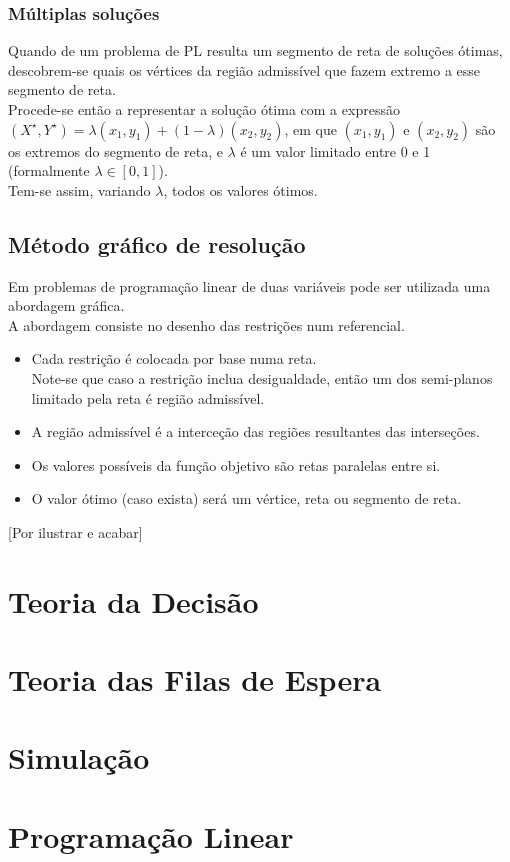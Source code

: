 \documentclass[]{report}
\begin{document}
\subsection{Múltiplas soluções}
Quando de um problema de PL resulta um segmento de reta de soluções ótimas, descobrem-se quais os vértices da região admissível que fazem extremo a esse segmento de reta.\\
Procede-se então a representar a solução ótima com a expressão $(X^\star, Y^\star) = \lambda (x_1, y_1)+(1-\lambda)(x_2, y_2)$, em que $(x_1, y_1)$ e $(x_2, y_2)$ são os extremos do segmento de reta, e $\lambda$ é um valor limitado entre 0 e 1 (formalmente $\lambda \in [0,1]$).\\
Tem-se assim, variando $\lambda$, todos os valores ótimos.
\section{Método gráfico de resolução}
Em problemas de programação linear de duas variáveis pode ser utilizada uma abordagem gráfica.\\
A abordagem consiste no desenho das restrições num referencial.
\begin{itemize}
\item Cada restrição é colocada por base numa reta.\\
Note-se que caso a restrição inclua desigualdade, então um dos semi-planos limitado pela reta é região admissível.
\item A região admissível é a interceção das regiões resultantes das interseções.
\item Os valores possíveis da função objetivo são retas paralelas entre si.
\item O valor ótimo (caso exista) será um vértice, reta ou segmento de reta.
\end{itemize}
[Por ilustrar e acabar]
\chapter{Teoria da Decisão}
\chapter{Teoria das Filas de Espera}
\chapter{Simulação}
\chapter{Programação Linear}
\end{document}
